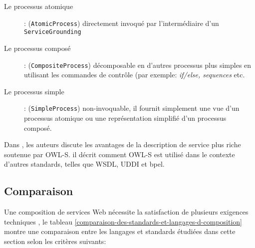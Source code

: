   \renewcommand{\descriptionlabel}[1]{\hspace{0.5cm}\textbullet~\textsf{#1}}
  \begin{description}
  \item[Le processus atomique]: (\verb|AtomicProcess|) directement
    invoqué par l'intermédiaire d'un \verb|ServiceGrounding|

  \item[Le processus composé]: (\verb|CompositeProcess|) décomposable
    en d'autres processus plus simples en utilisant les commandes de
    contrôle (par exemple: \textit{if/else, sequences} etc.

  \item[Le processus simple]: (\verb|SimpleProcess|) non-invoquable,
    il fournit simplement une vue d'un processus atomique ou une
    représentation simplifié d'un processus composé.
  \end{description}
  \enddescription

  Dans \cite{martin2004owl}, les auteurs discute les avantages de la
  description de service plus riche soutenue par \textsc{OWL-S}. il
  décrit comment \textsc{OWL-S} est utilisé dans le contexte d'autres
  standards, telles que \textsc{WSDL}, \textsc{UDDI} et \acrshort{bpel}.

  \subsection{Comparaison}
  \label{sec:langs-comparaison}
  Une composition de services Web nécessite la satisfaction de
  plusieurs exigences techniques \cite{sheng2014web,
    bucchiarone2006survey} , le tableau
  \ref{comparaison-des-standards-et-langages-d-composition} montre une
  comparaison entre les langages et standards étudiées dans cette
  section selon les critères suivants:

  

